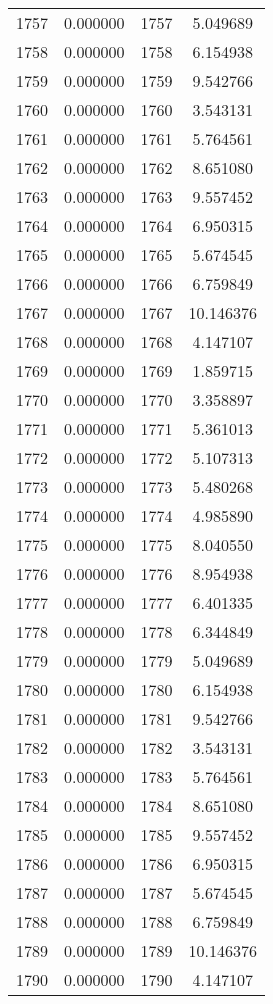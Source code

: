 \documentclass[12pt]{article}
\begin{document}
\begin{longtable}{@{}cccc@{}}
1757 & 0.000000 & 1757 & 5.049689 \\
1758 & 0.000000 & 1758 & 6.154938 \\
1759 & 0.000000 & 1759 & 9.542766 \\
1760 & 0.000000 & 1760 & 3.543131 \\
1761 & 0.000000 & 1761 & 5.764561 \\
1762 & 0.000000 & 1762 & 8.651080 \\
1763 & 0.000000 & 1763 & 9.557452 \\
1764 & 0.000000 & 1764 & 6.950315 \\
1765 & 0.000000 & 1765 & 5.674545 \\
1766 & 0.000000 & 1766 & 6.759849 \\
1767 & 0.000000 & 1767 & 10.146376 \\
1768 & 0.000000 & 1768 & 4.147107 \\
1769 & 0.000000 & 1769 & 1.859715 \\
1770 & 0.000000 & 1770 & 3.358897 \\
1771 & 0.000000 & 1771 & 5.361013 \\
1772 & 0.000000 & 1772 & 5.107313 \\
1773 & 0.000000 & 1773 & 5.480268 \\
1774 & 0.000000 & 1774 & 4.985890 \\
1775 & 0.000000 & 1775 & 8.040550 \\
1776 & 0.000000 & 1776 & 8.954938 \\
1777 & 0.000000 & 1777 & 6.401335 \\
1778 & 0.000000 & 1778 & 6.344849 \\
1779 & 0.000000 & 1779 & 5.049689 \\
1780 & 0.000000 & 1780 & 6.154938 \\
1781 & 0.000000 & 1781 & 9.542766 \\
1782 & 0.000000 & 1782 & 3.543131 \\
1783 & 0.000000 & 1783 & 5.764561 \\
1784 & 0.000000 & 1784 & 8.651080 \\
1785 & 0.000000 & 1785 & 9.557452 \\
1786 & 0.000000 & 1786 & 6.950315 \\
1787 & 0.000000 & 1787 & 5.674545 \\
1788 & 0.000000 & 1788 & 6.759849 \\
1789 & 0.000000 & 1789 & 10.146376 \\
1790 & 0.000000 & 1790 & 4.147107 \\

\end{longtable}
\end{document}
